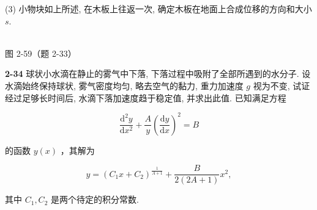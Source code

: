 (3) 小物块如上所述, 在木板上往返一次, 确定木板在地面上合成位移的方向和大小 $s$.

\begin{center}
\resizebox{0.50\textwidth}{!}{}\\[4pt]
{\small 图 2-59（题 2-33）}
\end{center}

\newpage

\textbf{2-34} 球状小水滴在静止的雾气中下落, 下落过程中吸附了全部所遇到的水分子. 设水滴始终保持球状, 雾气密度均匀, 略去空气的黏力, 重力加速度 $g$ 视为不变, 试证经过足够长时间后, 水滴下落加速度趋于稳定值, 并求出此值. 已知满足方程

\[
\frac {\mathrm{d} ^ {2} y}{\mathrm{d} x ^ {2}} + \frac {A}{y} \left(\frac {\mathrm{d} y}{\mathrm{d} x}\right) ^ {2} = B
\]

的函数 $y(x)$ ，其解为

\[
y = (C _ {1} x + C _ {2}) ^ {\frac {1}{A + 1}} + \frac {B}{2 (2 A + 1)} x ^ {2},
\]

其中 $C_1, C_2$ 是两个待定的积分常数.
